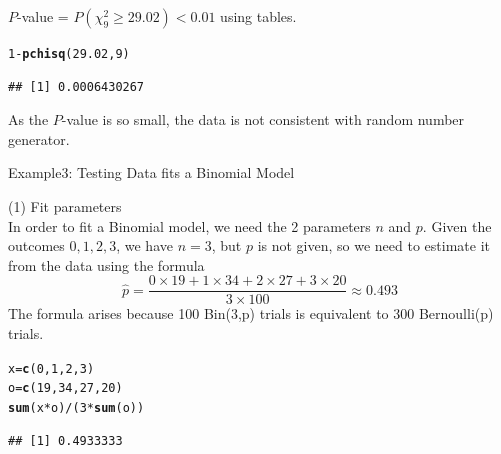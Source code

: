 \documentclass[t,xcolor=pdftex,dvipsnames,table]{beamer}\usepackage[]{graphicx}\usepackage[]{color}
\makeatletter
\newcommand{\hlnum}[1]{\textcolor[rgb]{0.686,0.059,0.569}{#1}}%
\newcommand{\hlopt}[1]{\textcolor[rgb]{0,0,0}{#1}}%
\newcommand{\hlstd}[1]{\textcolor[rgb]{0.345,0.345,0.345}{#1}}%
\newcommand{\hlkwb}[1]{\textcolor[rgb]{0.69,0.353,0.396}{#1}}%
\newcommand{\hlkwd}[1]{\textcolor[rgb]{0.737,0.353,0.396}{\textbf{#1}}}%
\newenvironment{kframe}{%
 \def\at@end@of@kframe{}%
 \ifinner\ifhmode%
  \def\at@end@of@kframe{\end{minipage}}%
  \begin{minipage}{\columnwidth}%
 \fi\fi%
 \def\FrameCommand##1{\hskip\@totalleftmargin \hskip-\fboxsep
 \colorbox{shadecolor}{##1}\hskip-\fboxsep
     \hskip-\linewidth \hskip-\@totalleftmargin \hskip\columnwidth}%
 \MakeFramed {\advance\hsize-\width
   \@totalleftmargin\z@ \linewidth\hsize
   \@setminipage}}%
 {\par\unskip\endMakeFramed%
 \at@end@of@kframe}
\newenvironment{knitrout}{}{} %
\makeatother
\begin{document}
\begin{frame}[fragile]{}
 $P$-value = $P( \chi^2_{9} \geq 29.02) < 0.01$ using tables.

\begin{knitrout}
\color{fgcolor}\begin{kframe}
\begin{alltt}
\hlnum{1}\hlopt{-}\hlkwd{pchisq}\hlstd{(}\hlnum{29.02}\hlstd{,}\hlnum{9}\hlstd{)}
\end{alltt}
\begin{verbatim}
## [1] 0.0006430267
\end{verbatim}
\end{kframe}
\end{knitrout}

 As the $P$-value is so small, the data is not consistent with random number generator.
\end{frame} 


\begin{frame}[fragile]{Example3: Testing Data fits a Binomial Model}


\vspace{.5cm}
(1) Fit parameters \\
In order to fit a Binomial model, we need the 2 parameters $n$ and $p$. Given the outcomes $0,1,2,3$, we have $n=3$, but $p$ is not given, so we need to estimate it from the data using the formula
\[ \hat{p} = \frac{0 \times 19 + 1 \times 34 + 2 \times 27 + 3 \times 20}{3 \times 100} \approx 0.493   \]
The formula arises because 100 Bin(3,p) trials is equivalent to 300 Bernoulli(p) trials.

\begin{knitrout}
\color{fgcolor}\begin{kframe}
\begin{alltt}
\hlstd{x}\hlkwb{=}\hlkwd{c}\hlstd{(}\hlnum{0}\hlstd{,}\hlnum{1}\hlstd{,}\hlnum{2}\hlstd{,}\hlnum{3}\hlstd{)}
\hlstd{o}\hlkwb{=}\hlkwd{c}\hlstd{(}\hlnum{19}\hlstd{,}\hlnum{34}\hlstd{,}\hlnum{27}\hlstd{,}\hlnum{20}\hlstd{)}
\hlkwd{sum}\hlstd{(x}\hlopt{*}\hlstd{o)}\hlopt{/}\hlstd{(}\hlnum{3}\hlopt{*}\hlkwd{sum}\hlstd{(o))}
\end{alltt}
\begin{verbatim}
## [1] 0.4933333
\end{verbatim}
\end{kframe}
\end{knitrout}
\end{frame} 
\end{document}
